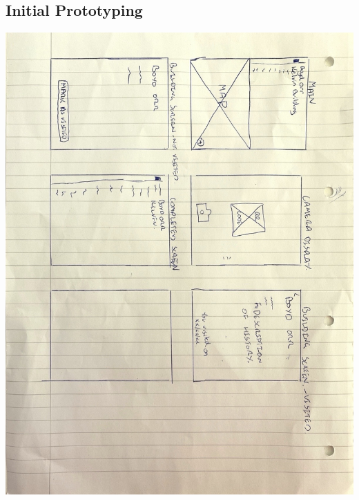 \documentclass[a4,10pt,twocolumn]{article}
\begin{document}
\subsection{Initial Prototyping}
\label{app:proto}
\noindent\includegraphics[width=\columnwidth]{paperPrototype1.jpeg}
\end{document}
